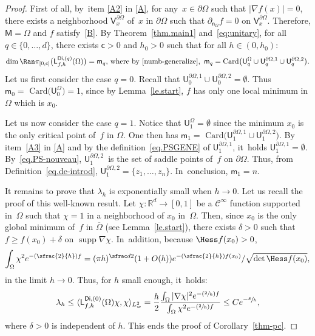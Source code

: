 \documentclass[10pt]{amsart}
\newcommand{\Psfrac}[2]{(\sfrac{#1}{#2})}
\let\pa\partial
\DeclareMathOperator\supp{supp}
\theoremstyle{plain}
\theoremstyle{definition}
\begin{document}
\begin{proof}
First of all, by~item \eqref{A2} in \ref{A}, for any~$x\in \partial \Omega$ such that $\vert \nabla f(x)\vert =0$, there exists a neighborhood $\mathsf V_x^{\partial \Omega}$ of~$x$ in $\partial \Omega$ such that $ \partial_{\mathsf n_{ \Omega}}f =0 \text{ on } \mathsf V_x^{\partial \Omega}$.
Therefore, $\mathsf M=\Omega$ and $f$ satisfy~\ref{B}.
By Theorem~\ref{thm.main1} and~\eqref{eq:unitary},
for all $q\in \{0,\ldots,d\}$, there exists $\mathsf c>0$ and $h_0>0$ such that for all $h\in (0,h_0)$:
\[
\dim \Ran \pi_{[0,\mathsf c]}\bigl(\mathsf L_{f,h}^{\mathsf{Di},(q)}(\Omega)\bigr)=\mathsf m_q, \,
\text{where by~\eqref{numb-generalize}, }\,
\mathsf m_q=\text{Card}\bigl(\mathsf U_q^{\Omega}\cup \mathsf U^{\partial \Omega,1}_q\cup \mathsf U^{\partial \Omega,2}_q\bigr).
\]
Let us first consider the case $q=0$. Recall that $ \mathsf
U^{\partial \Omega,1}_0\cup \mathsf U^{\partial
\Omega,2}_0=\emptyset$. Thus $\mathsf m_0=\text{ Card}\bigl(\mathsf
U_0^{\Omega})=1$, since by Lemma~\ref{le.start}, $f$ has only one
local minimum in $\Omega$ which is $x_0$.

Let us now consider the case $q=1$. Notice that
$\mathsf U_1^{\Omega}=\emptyset$ since the minimum $x_0$ is the
only
critical point of~$f$ in $\Omega$. One then has
$\mathsf m_1=\text{ Card}\bigl(\mathsf U^{\partial \Omega,1}_1\cup
\mathsf U^{\partial \Omega,2}_1\bigr)$. By item~\eqref{A3} in \ref{A} and
by the definition~\eqref{eq.PSGENE} of $\mathsf U^{\partial \Omega,1}_1$, it~holds $\mathsf U^{\partial \Omega,1}_1=\emptyset$.
By~\eqref{eq.PS-nouveau}, $\mathsf U_1^{\pa \Omega,2}$~is the set
of saddle points of~$f$ on $\partial \Omega$. Thus, from
Definition~\ref{eq.de-introd}, $\mathsf U_1^{\pa
\Omega,2}=\{z_1,\ldots,z_n\}$. In~conclusion, $\mathsf m_1= n$.

It remains to prove that $\lambda_h$ is exponentially small when $h\to
0$. Let us recall the proof of this well-known result. Let $\chi:\mathbb R^d\to [0,1]$ be a $\mathcal C^\infty$ function supported in~$\Omega$ such that $\chi=1$ in a neighborhood of $x_0$ in~$\Omega$. Then, since $x_0$ is the only global minimum of~$f$ in $\overline \Omega$ (see Lemma~\ref{le.start}), there exists $\delta>0$ such that $f\ge f(x_0)+\delta$ on $\supp \nabla \chi$. In~addition, because $\Hess f(x_0)>0$,
\[
\int_{\Omega} \chi^2 e^{-\Psfrac 2h f}  = (\pi h)^{\sfrac d2} (1+O(h))e^{-\Psfrac 2h f(x_0)} /\sqrt{\det \Hess f(x_0)},
\]
in the limit $h\to 0$. Thus, for $h$ small enough, it~holds:\vspace*{-3pt}
\[
\lambda_h\le \langle \mathsf L_{f,h}^{\mathsf{Di}, (0)}(\Omega)\chi, \chi\rangle_{L^2_w}= \frac h2 \frac {\int_{\Omega} |\nabla \chi|^2 e^{-\Psfrac 2h f} }{\int_{\Omega} \chi^2 e^{-\Psfrac 2h f}}  \le Ce^{-\sfrac \delta h},
\]
where $\delta>0$ is independent of $h$.
This ends the proof of Corollary~\ref{thm-pc}.
\end{proof}
\end{document}
